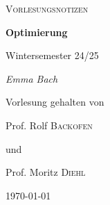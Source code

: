 \begin{titlepage}
	\centering
	{\Large \textsc{Vorlesungsnotizen}\par}
	\vspace{0.5cm}
	{\huge\bfseries Optimierung\par}
	\vspace{1cm}
    {\Large Wintersemester 24/25\par}
    \vspace{1cm}
	{\Large\itshape Emma Bach\par}
	\vfill
	Vorlesung gehalten von\par
	Prof. Rolf \textsc{Backofen}\par
	und\par
	Prof. Moritz \textsc{Diehl}

	\vfill

	{\large \today\par}
\end{titlepage}
